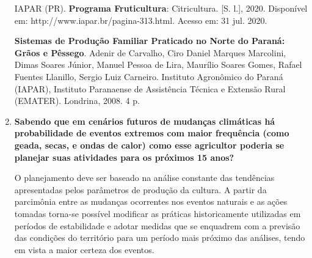 \documentclass[a4paper, 12pt, brazilian]{article}
\begin{document}
\begin{enumerate}
		IAPAR (PR). \textbf{Programa Fruticultura}: Citricultura. [S. l.], 2020. Disponível em: http://w\-ww.iapar.br/pagina-313.html. Acesso em: 31 jul. 2020.
		
		\textbf{Sistemas de Produção Familiar Praticado no Norte do Paraná: Grãos e Pêssego}. Adenir de Carvalho, Ciro Daniel Marques Marcolini,
		Dimas Soares Júnior, Manuel Pessoa de Lira, Maurílio Soares Gomes, Rafael Fuentes Llanillo, Sergio Luiz Carneiro. Instituto Agronômico do
		Paraná (IAPAR), Instituto Paranaense de Assistência Técnica e Extensão Rural (EMATER). Londrina, 2008. 4 p.
		
		\item\textbf{Sabendo que em cenários futuros de mudanças climáticas há probabilidade de eventos extremos com maior frequência (como geada, secas, e ondas de calor) como esse agricultor poderia se planejar suas atividades para os próximos 15 anos?}
		
		\hspace{.5cm}O planejamento deve ser baseado na análise constante das tendências apresentadas pelos parâmetros de produção da cultura. A partir da parcimônia entre as mudanças ocorrentes nos eventos naturais e as ações tomadas torna-se possível modificar as práticas historicamente utilizadas em períodos de estabilidade e adotar medidas que se enquadrem com a previsão das condições do território para um período mais próximo das análises, tendo em vista a maior certeza dos eventos. 
	\end{enumerate}
\end{document}
